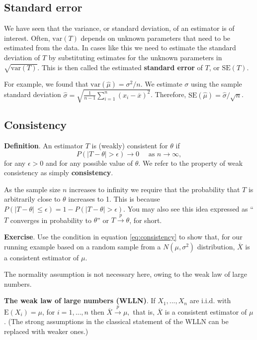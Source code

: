 \documentclass[
  british,
  11pt,
  openany, a4paper]{book}
\begin{document}
\subsection{Standard error}\label{standard-error}

We have seen that the variance, or standard deviation, of an estimator is of interest. Often, \(\text{var}(T)\) depends on unknown parameters that need to be estimated from the data. In cases like this we need to estimate the standard deviation of \(T\) by substituting estimates for the unknown parameters in \(\sqrt{\text{var}(T)}\). This is then called the estimated \textbf{standard error} of \(T\), or \(\text{SE}(T)\).

For example, we found that \(\text{var}(\hat{\mu})=\sigma^2/n\). We estimate \(\sigma\) using the sample standard deviation \(\hat{\sigma} = \sqrt{\frac{1}{n-1}\sum_{i=1}^n (x_i-\overline{x})^2}\). Therefore, \(\text{SE}(\hat{\mu})=\hat{\sigma}/\sqrt{n}\).

\subsection{Consistency}\label{consistency}

\textbf{Definition}. An estimator \(T\) is (weakly) consistent for \(\theta\) if
\begin{equation}
P(| T-\theta |>\epsilon) \rightarrow 0 \quad \text{  as  } n \rightarrow \infty,
\label{eq:consistency}
\end{equation}
for any \(\epsilon>0\) and for any possible value of \(\theta\). We refer to the property of weak consistency as simply \textbf{consistency}.

As the sample size \(n\) increases to infinity we require that the probability that \(T\) is arbitrarily close to \(\theta\) increases to 1. This is because \(P(| T - \theta | \, \leq \epsilon) = 1 - P(| T - \theta | > \epsilon)\). You may also see this idea expressed as ``\(T\) converges in probability to \(\theta\)'' or \(T \overset{p}{\to} \theta\), for short.

\textbf{Exercise}. Use the condition in equation \eqref{eq:consistency} to show that, for our running example based on a random sample from a \(N(\mu, \sigma^2)\) distribution, \(\overline{X}\) is a consistent estimator of \(\mu\).

The normality assumption is not necessary here, owing to the weak law of large numbers.

\textbf{The weak law of large numbers (WLLN)}. If \(X_1, ..., X_n\) are i.i.d. with \(\text{E}(X_i)=\mu\), for \(i=1, ..., n\) then \(\overline{X} \overset{p}{\to} \mu,\) that is, \(\overline{X}\) is a consistent estimator of \(\mu\). (The strong assumptions in the classical statement of the WLLN can be replaced with weaker ones.)
\end{document}
